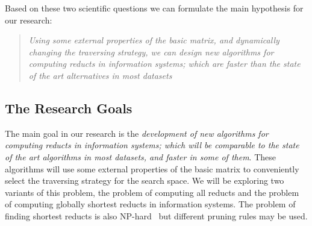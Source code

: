 \documentclass[authoryear,11pt]{elsarticle}
\begin{document}
  Based on these two scientific questions we can formulate the main hypothesis for our research:
  
\begin{quote}
  \emph{Using some external properties of the basic matrix, and dynamically changing the traversing 
  		strategy, we can design new algorithms for computing reducts in information systems; which are
  		faster than the state of the art alternatives in most datasets}
\end{quote}  

\subsection{The Research Goals}\label{Goals} 
  The main goal in our research is the \emph{development of new algorithms for computing reducts in
  information systems; which will be comparable to the state of the art algorithms 
  in most datasets, and faster in some of them}. These algorithms will use some external properties of the
  basic matrix to conveniently select the traversing strategy for the search space. We will be exploring two
  variants of this problem, the problem of computing all reducts and the problem of computing globally 
  shortest reducts in information systems. The problem of finding shortest reducts is also 
  NP-hard~\citep{Lin04} but different pruning rules may be used.
  
\end{document}
